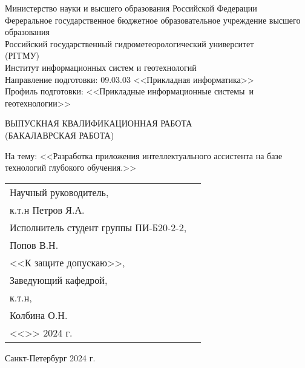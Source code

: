 \newcommand{\signplace}{\underline{\hspace{40mm}}}
\newcommand{\dateblank}{%
    <<\underline{\hspace{10mm}}>> \underline{\hspace{30mm}} 2024 г.%
}
\newlength{\twointerv}\setlength{\twointerv}{28.34pt}

\begin{titlepage}
    \singlespacing
    \setlength{\parindent}{0pt}
    \begin{center}
        Министерство науки и высшего образования Российской Федерации\\
        Фереральное государственное бюджетное образовательное учреждение
высшего образования\\
        Российский государственный гидрометеорологический университет\\
        (РГГМУ)\\
        Институт информационных систем и геотехнологий\\
        Направление подготовки: 09.03.03 <<Прикладная информатика>>\\
        Профиль подготовки: <<Прикладные информационные системы\
        и геотехнологии>>

    \end{center}
    \vspace{\oneinterv}
    \begin{center}
    ВЫПУСКНАЯ КВАЛИФИКАЦИОННАЯ РАБОТА\\
    (БАКАЛАВРСКАЯ РАБОТА)
    \end{center}
    \vspace{\oneinterv}
    На тему: <<Разработка приложения интеллектуального ассистента на базе
    технологий глубокого обучения.>>
    \vspace{\twointerv}

    \vfill

    \begin{tabular}{N{70mm}N{80mm}}
        Научный руководитель,\\
        к.т.н Петров Я.А.& \signplace{}\\
        \vspace{5mm}
        Исполнитель студент группы ПИ-Б20-2-2,\\Попов В.Н. & \signplace{}\\
        \vspace{5mm}
        <<К защите допускаю>>,\\
        Заведующий кафедрой,\\
        к.т.н,\\
        Колбина О.Н.\\
        \dateblank{} & \signplace{}\\
    \end{tabular}

    \vfill

    \begin{center}
        Санкт-Петербург 2024 г.
    \end{center}
\end{titlepage}
\setcounter{page}{2}
\pagestyle{}
